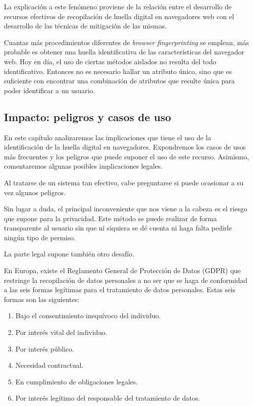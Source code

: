 La explicación a este fenómeno proviene de la relación entre el desarrollo de recursos efectivos de recopilación de huella digital en navegadores web con el desarrollo de las técnicas de mitigación de las mismas. \par 

Cuantas más procedimientos diferentes de \textit{browser fingerprinting} se emplean, más probable es obtener una huella identificativa de las características del navegador web. Hoy en día, el uso de ciertas métodos aislados no resulta del todo identificativo. Entonces no es necesario hallar un atributo único, sino que es suficiente con encontrar una combinación de atributos que resulte única para poder identificar a un usuario. \par

\subsection{Impacto: peligros y casos de uso}

En este capítulo analizaremos las implicaciones que tiene el uso de la identificación de la huella digital en navegadores. Expondremos los casos de usos más frecuentes y los peligros que puede suponer el uso de este recurso. Asimismo, comentaremos algunas posibles implicaciones legales. \par

Al tratarse de un sistema tan efectivo, cabe preguntarse si puede ocasionar a su vez algunos peligros. \par

Sin lugar a duda, el principal inconveniente que nos viene a la cabeza es el riesgo que supone para la privacidad. Este método se puede realizar de forma transparente al usuario sin que ni siquiera se dé cuenta ni haga falta pedirle ningún tipo de permiso\cite{challenges}. \par 

La parte legal supone también otro desafío. \par

En Europa, existe el Reglamento General de Protección de Datos (GDPR) que restringe la recopilación de datos personales a no ser que se haga de conformidad a las seis formas legítimas para el tratamiento de datos personales. Estas seis formas son las siguientes: \par

\begin{enumerate}
\item Bajo el consentimiento inequívoco del individuo.
\item Por interés vital del individuo.
\item Por interés público.
\item Necesidad contractual.
\item En cumplimiento de obligaciones legales.
\item Por interés legítimo del responsable del tratamiento de datos.
\end{enumerate}


